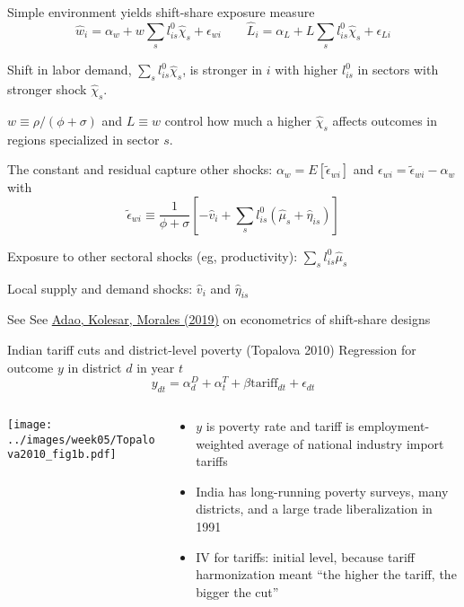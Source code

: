 \documentclass[11pt,notes=hide,aspectratio=169]{beamer}
\begin{document}
\begin{frame}{Simple environment yields shift-share exposure measure}
\vspace{-4mm}
\begin{equation*}
    \hat{w}_{i} = \alpha_{w} + w \sum_{s}l_{is}^{0}\hat{\chi}_{s} + \epsilon_{w i}
	\qquad
    \hat{L}_{i} = \alpha_{L} + L \sum_{s}l_{is}^{0}\hat{\chi}_{s} + \epsilon_{L i}
\end{equation*}
\vspace{-4mm}
\begin{itemize}{\small
    \item Shift in labor demand, $\sum_{s}l_{is}^{0}\hat{\chi}_{s}$, is stronger in $i$ with higher $l_{is}^{0}$ in sectors with stronger shock $\hat{\chi}_{s}$.
    \item $w \equiv \rho/(\phi+\sigma)$ and $L \equiv w$ control how much a higher $\hat{\chi}_{s}$ affects outcomes in regions specialized in sector $s$.
    \item The constant and residual capture other shocks: $\alpha_{w} = E[\tilde{\epsilon}_{w i}]$ and $\epsilon_{w i} = \tilde{\epsilon}_{w i} - \alpha_{w}$ with
    $$ \tilde{\epsilon}_{w i} \equiv \frac{1}{\phi+\sigma}\left[-\hat{v}_{i} + \sum_{s}l_{is}^{0}(\hat{\mu}_{s} + \hat{\eta}_{is})\right] $$
    \item Exposure to other sectoral shocks (eg, productivity): $\sum_{s}l_{is}^{0}\hat{\mu}_{s}$
    \item Local supply and demand shocks: $\hat{v}_{i}$ and $\hat{\eta}_{is}$
    \item See See \href{https://academic.oup.com/qje/article-abstract/134/4/1949/5552146}{Adao, Kolesar, Morales (2019)} on econometrics of shift-share designs
}\end{itemize}
\end{frame}
\begin{frame}{Indian tariff cuts and district-level poverty (Topalova 2010)}
Regression for outcome $y$ in district $d$ in year $t$
\begin{equation*}
	y_{dt} = \alpha_d^D + \alpha_t^T + \beta \text{tariff}_{dt} + \epsilon_{dt}
\end{equation*}
\vspace{-3mm}
\begin{columns}
\begin{column}{.4\textwidth}
\texttt{[image: ../images/week05/Topalova2010\_fig1b.pdf]}
\end{column}
\begin{column}{.58\textwidth}
\begin{itemize}
	\item $y$ is poverty rate and tariff is employment-weighted average of national industry import tariffs
	\item India has long-running poverty surveys, many districts, and a large trade liberalization in 1991
	\item IV for tariffs: initial level, because tariff harmonization meant ``the higher the tariff, the bigger the cut''
\end{itemize}
\end{column}
\end{columns}
\end{frame}
\end{document}
